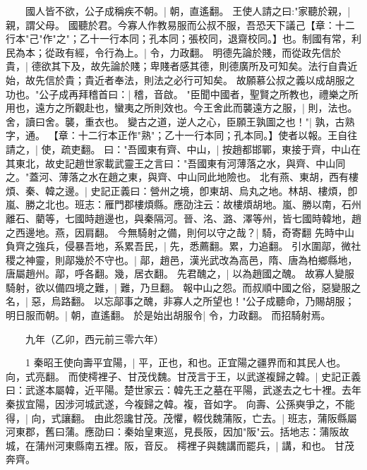 　　國人皆不欲，公子成稱疾不朝。|{
	朝，直遙翻。
	}
王使人請之曰:"家聽於親，|{
	親，謂父母。
	}
國聽於君。今寡人作教易服而公叔不服，吾恐天下議己【章：十二行本"己"作"之"；乙十一行本同；孔本同；張校同，退齋校同。】也。制國有常，利民為本；從政有經，令行為上。|{
	令，力政翻。
	}
明德先論於賤，而從政先信於貴，|{
	德欲其下及，故先論於賤；卑賤者感其德，則德廣所及可知矣。法行自貴近始，故先信於貴；貴近者奉法，則法之必行可知矣。
	}
故願慕公叔之義以成胡服之功也。"公子成再拜稽首曰：|{
	稽，音啟。
	}
"臣聞中國者，聖賢之所教也，禮樂之所用也，遠方之所觀赴也，蠻夷之所則效也。今王舍此而襲遠方之服，|{
	則，法也。舍，讀曰舍。襲，重衣也。
	}
變古之道，逆人之心，臣願王孰圖之也！"|{
	孰，古熟字，通。
	}
【章：十二行本正作"熟"；乙十一行本同；孔本同。】使者以報。王自往請之，|{
	使，疏吏翻。
	}
曰："吾國東有齊、中山，|{
	按趙都邯鄲，東接于齊，中山在其東北，故史記趙世家載武靈王之言曰："吾國東有河薄落之水，與齊、中山同之。"蓋河、薄落之水在趙之東，與齊、中山同此地險也。
	}
北有燕、東胡，西有樓煩、秦、韓之邊。|{
	史記正義曰：營州之境，卽東胡、烏丸之地。林胡、樓煩，卽嵐、勝之北也。班志：雁門郡樓煩縣。應劭注云：故樓煩胡地。嵐、勝以南，石州離石、藺等，七國時趙邊也，與秦隔河。晉、洺、潞、澤等州，皆七國時韓地，趙之西邊地。燕，因肩翻。
	}
今無騎射之備，則何以守之哉？|{
	騎，奇寄翻
	}
先時中山負齊之強兵，侵暴吾地，系累吾民，|{
	先，悉薦翻。累，力追翻。
	}
引水圍鄗，微社稷之神靈，則鄗幾於不守也。|{
	鄗，趙邑，漢光武改為高邑，隋、唐為柏鄉縣地，唐屬趙州。鄗，呼各翻。幾，居衣翻。
	}
先君醜之，|{
	以為趙國之醜。
	}
故寡人變服騎射，欲以備四境之難，|{
	難，乃旦翻。
	}
報中山之怨。而叔順中國之俗，惡變服之名，|{
	惡，烏路翻。
	}
以忘鄗事之醜，非寡人之所望也！"公子成聽命，乃賜胡服；明日服而朝。|{
	朝，直遙翻。
	}
於是始出胡服令|{
	令，力政翻。
	}
而招騎射焉。

　　九年（乙卯，西元前三零六年）

　　1 秦昭王使向壽平宜陽，|{
	平，正也，和也。正宜陽之疆界而和其民人也。向，式亮翻。
	}
而使樗裡子、甘茂伐魏。甘茂言于王，以武遂複歸之韓。|{
	史記正義曰：武遂本屬韓，近平陽。楚世家云：韓先王之墓在平陽，武遂去之七十裡。去年秦拔宜陽，因涉河城武遂，今複歸之韓。複，音如字。
	}
向壽、公孫奭爭之，不能得，|{
	向，式讓翻。
	}
由此怨讒甘茂。茂懼，輟伐魏蒲阪，亡去。|{
	班志，蒲阪縣屬河東郡，舊曰蒲。應劭曰：秦始皇東巡，見長阪，因加"阪"云。括地志：蒲阪故城，在蒲州河東縣南五裡。阪，音反。
	}
樗裡子與魏講而罷兵，|{
	講，和也。
	}
甘茂奔齊。

